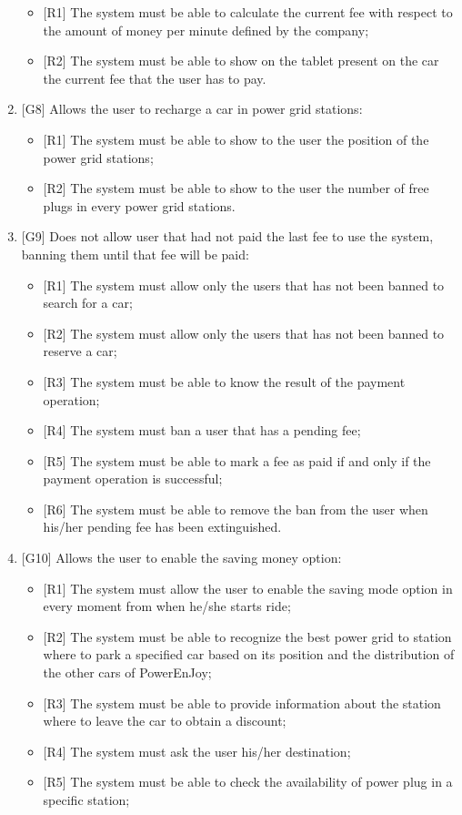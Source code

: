 \begin{enumerate}
\begin{itemize}
	\item {[R1]} The system must be able to calculate the current fee with respect to the amount of money per minute defined by the company;
	\item {[R2]} The system must be able to show on the tablet present on the car the current fee that the user has to pay.
\end{itemize}

\item {[G8]} Allows the user to recharge a car in power grid stations:

\begin{itemize}
	\item {[R1]} The system must be able to show to the user the position of the power grid stations;
	\item {[R2]} The system must be able to show to the user the number of free plugs in every power grid stations.
\end{itemize}

\item {[G9]} Does not allow user that had not paid the last fee to use the system, banning them until that fee will be paid:

\begin{itemize}
	\item {[R1]} The system must allow only the users that has not been banned to search for a car;
	\item {[R2]} The system must allow only the users that has not been banned to reserve a car;
	\item {[R3]} The system must be able to know the result of the payment operation;
	\item {[R4]} The system must ban a user that has a pending fee;
	\item {[R5]} The system must be able to mark a fee as paid if and only if the payment operation is successful;
	\item {[R6]} The system must be able to remove the ban from the user when his/her pending fee has been extinguished.
\end{itemize}

\item {[G10]} Allows the user to enable the saving money option:

\begin{itemize}
	\item {[R1]} The system must allow the user to enable the saving mode option in every moment from when he/she starts ride;
	\item {[R2]} The system must be able to recognize the best power grid to station where to park a specified car based on its position and the distribution of the other cars of PowerEnJoy;
	\item {[R3]} The system must be able to provide information about the station where to leave the car to obtain a discount;
	\item {[R4]} The system must ask the user his/her destination;
	\item {[R5]} The system must be able to check the availability of power plug in a specific station;
\end{itemize}


\end{enumerate}
